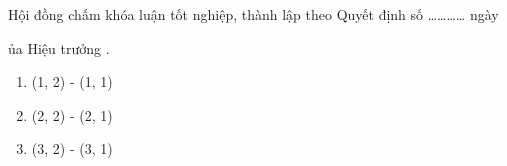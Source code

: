 
Hội đồng chấm khóa luận tốt nghiệp, thành lập theo Quyết định số ………… ngày \date của Hiệu trưởng \university.

\begin{enumerate}
	\item \board(1, 2) - \board(1, 1)
	\item \board(2, 2) - \board(2, 1)
	\item \board(3, 2) - \board(3, 1)
\end{enumerate}
